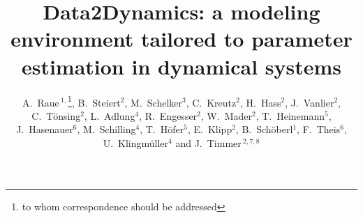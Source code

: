 \documentclass{bioinfo}
\begin{document}

\title[Data2Dynamics]{Data2Dynamics: a modeling environment tailored to parameter 
estimation in dynamical systems}
\author[A.~Raue \textit{et~al.}]{A.~Raue\,$^{1,}$\footnote{to whom correspondence 
should be addressed}, B.~Steiert$^{2}$, M.~Schelker$^{3}$, C.~Kreutz$^{2}$, H.~Hass$^{2}$, J.~Vanlier$^{2}$, C.~T\"onsing$^{2}$, L.~Adlung$^{4}$, R.~Engesser$^{2}$, W.~Mader$^{2}$, T.~Heinemann$^{5}$, J.~Hasenauer$^{6}$, M.~Schilling$^{4}$, T.~H\"ofer$^{5}$, E.~Klipp$^{2}$, B.~Sch\"oberl$^{1}$, F.~Theis$^{6}$, U.~Klingm\"uller$^{4}$ and J.~Timmer\,$^{2,7,8}$}
\address{$^{1}$Merrimack Pharmaceuticals Inc., 02139 Cambridge, MA, USA\\
$^{2}$University of Freiburg, Institute for Physics, 79104 Freiburg, Germany\\
$^{3}$Humboldt-Universit\"at zu Berlin, Theoretical Biophysics, 10115 Berlin, Germany\\
$^{4}$German Cancer Research Center, 69120 Heidelberg, Germany.\\
$^{5}$BioQuant, University of Heidelberg, 69120 Freiburg, Germany\\
$^{6}$Helmholtz Center Munich, 85764 Neuherberg, Germany.\\
$^{7}$BIOSS Centre for Biological Signalling Studies, University of Freiburg, 79104 Freiburg, Germany\\
$^{8}$Zentrum f\"ur Biosystemanalyse, University of Freiburg, 79104 Freiburg, 
Germany}



\maketitle
\end{document}
